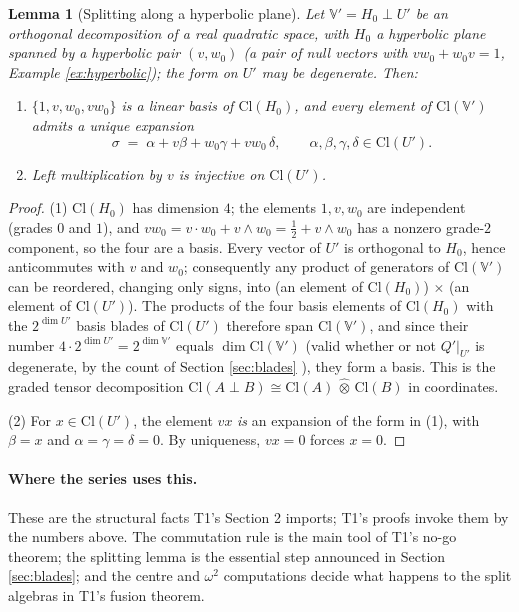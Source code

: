 \documentclass[11pt]{article}
\theoremstyle{plain}
\newtheorem{lemma}[theorem]{Lemma}
\theoremstyle{definition}
\newcommand{\Cl}{\mathrm{Cl}}
\begin{document}
\begin{lemma}[Splitting along a hyperbolic plane]\label{tk:split}
Let $\mathbb{V}' = H_0 \perp U'$ be an orthogonal decomposition of a real quadratic space, with $H_0$ a hyperbolic plane spanned by a hyperbolic pair $(v, w_0)$ (a pair of null vectors with $v w_0 + w_0 v = 1$, Example \ref{ex:hyperbolic}); the form on $U'$ may be degenerate. Then:
\begin{enumerate}
\item $\{1, v, w_0, v w_0\}$ is a linear basis of $\Cl(H_0)$, and every element of $\Cl(\mathbb{V}')$ admits a \emph{unique} expansion
\[
\sigma \;=\; \alpha + v\beta + w_0\gamma + v w_0\,\delta, \qquad \alpha, \beta, \gamma, \delta \in \Cl(U').
\]
\item Left multiplication by $v$ is injective on $\Cl(U')$.
\end{enumerate}
\end{lemma}

\begin{proof}
(1) $\Cl(H_0)$ has dimension $4$; the elements $1, v, w_0$ are independent (grades $0$ and $1$), and $v w_0 = v \cdot w_0 + v \wedge w_0 = \tfrac12 + v \wedge w_0$ has a nonzero grade-$2$ component, so the four are a basis. Every vector of $U'$ is orthogonal to $H_0$, hence anticommutes with $v$ and $w_0$; consequently any product of generators of $\Cl(\mathbb{V}')$ can be reordered, changing only signs, into (an element of $\Cl(H_0)$)$\,\times\,$(an element of $\Cl(U')$). The products of the four basis elements of $\Cl(H_0)$ with the $2^{\dim U'}$ basis blades of $\Cl(U')$ therefore span $\Cl(\mathbb{V}')$, and since their number $4 \cdot 2^{\dim U'} = 2^{\dim \mathbb{V}'}$ equals $\dim \Cl(\mathbb{V}')$ (valid whether or not $Q'|_{U'}$ is degenerate, by the count of Section \ref{sec:blades} \cite{Chevalley1997}), they form a basis. This is the graded tensor decomposition $\Cl(A \perp B) \cong \Cl(A)\,\hat{\otimes}\,\Cl(B)$ \cite{Lam2005} in coordinates.

(2) For $x \in \Cl(U')$, the element $vx$ \emph{is} an expansion of the form in (1), with $\beta = x$ and $\alpha = \gamma = \delta = 0$. By uniqueness, $vx = 0$ forces $x = 0$.
\end{proof}

\paragraph{Where the series uses this.} These are the structural facts T1's Section 2 imports; T1's proofs invoke them by the numbers above. The commutation rule is the main tool of T1's no-go theorem; the splitting lemma is the essential step announced in Section \ref{sec:blades}; and the centre and $\omega^2$ computations decide what happens to the split algebras in T1's fusion theorem.
\end{document}
